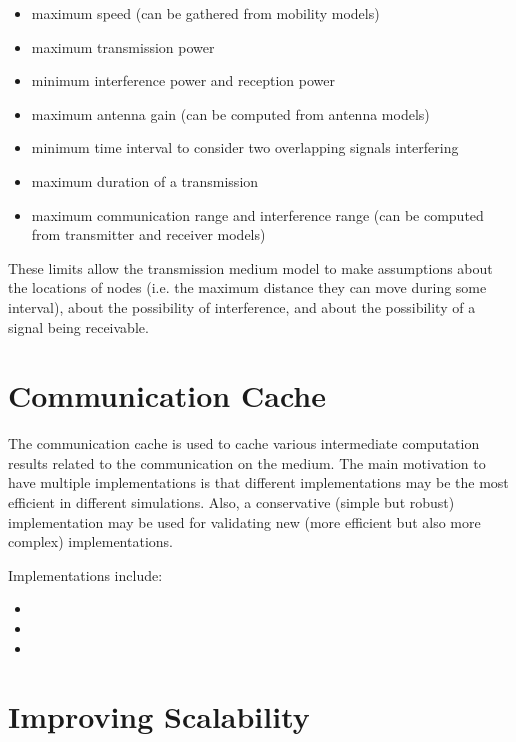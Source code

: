 \begin{itemize}
    \item maximum speed (can be gathered from mobility models)
    \item maximum transmission power
    \item minimum interference power and reception power
    \item maximum antenna gain (can be computed from antenna models)
    \item minimum time interval to consider two overlapping signals interfering
    \item maximum duration of a transmission
    \item maximum communication range and interference range
      (can be computed from transmitter and receiver models)
\end{itemize}

These limits allow the transmission medium model to make assumptions about the
locations of nodes (i.e. the maximum distance they can move during some
interval), about the possibility of interference, and about the possibility
of a signal being receivable.


\section{Communication Cache}
\label{sec:medium:communication-cache}

The communication cache is used to cache various intermediate computation
results related to the communication on the medium. The main motivation to have
multiple implementations is that different implementations may be the most
efficient in different simulations. Also, a conservative (simple but robust)
implementation may be used for validating new (more efficient but also more
complex) implementations.

Implementations include:

\begin{itemize}
  \item {}
  \item {}
  \item {}
\end{itemize}


\section{Improving Scalability}
\label{sec:medium:improving-scalability}

